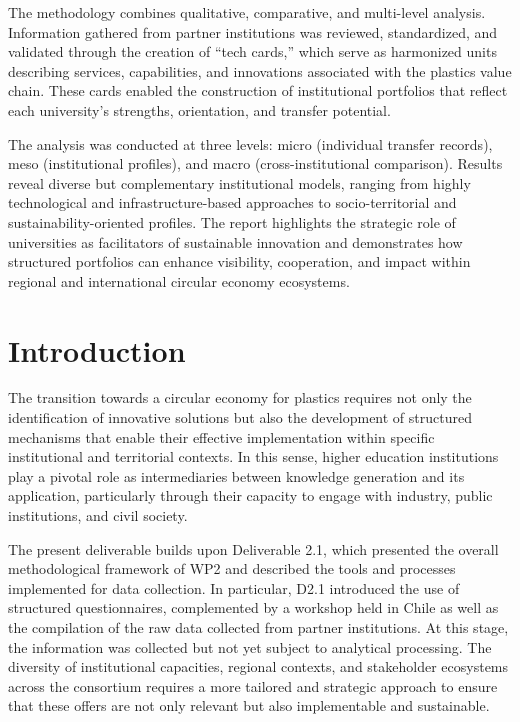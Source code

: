 \documentclass[
  12pt,
  oneside]{book}
\begin{document}
The methodology combines qualitative, comparative, and multi-level
analysis. Information gathered from partner institutions was reviewed,
standardized, and validated through the creation of ``tech cards,''
which serve as harmonized units describing services, capabilities, and
innovations associated with the plastics value chain. These cards
enabled the construction of institutional portfolios that reflect each
university's strengths, orientation, and transfer potential.

The analysis was conducted at three levels: micro (individual transfer
records), meso (institutional profiles), and macro (cross-institutional
comparison). Results reveal diverse but complementary institutional
models, ranging from highly technological and infrastructure-based
approaches to socio-territorial and sustainability-oriented profiles.
The report highlights the strategic role of universities as facilitators
of sustainable innovation and demonstrates how structured portfolios can
enhance visibility, cooperation, and impact within regional and
international circular economy ecosystems.

\chapter{Introduction}\label{introduction}

The transition towards a circular economy for plastics requires not only
the identification of innovative solutions but also the development of
structured mechanisms that enable their effective implementation within
specific institutional and territorial contexts. In this sense, higher
education institutions play a pivotal role as intermediaries between
knowledge generation and its application, particularly through their
capacity to engage with industry, public institutions, and civil
society.

The present deliverable builds upon Deliverable 2.1, which presented the
overall methodological framework of WP2 and described the tools and
processes implemented for data collection. In particular, D2.1
introduced the use of structured questionnaires, complemented by a
workshop held in Chile as well as the compilation of the raw data
collected from partner institutions. At this stage, the information was
collected but not yet subject to analytical processing. The diversity of
institutional capacities, regional contexts, and stakeholder ecosystems
across the consortium requires a more tailored and strategic approach to
ensure that these offers are not only relevant but also implementable
and sustainable.
\end{document}
